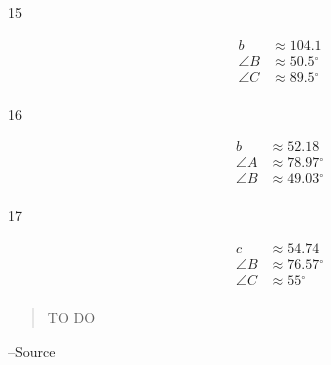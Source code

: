 \documentclass{exam}
\newcommand{\dg}{\ensuremath{^\circ}}
\begin{document}
\begin{description}
      \item[15]
        \begin{align*}
          b        & \approx 104.1 \\
          \angle B & \approx 50.5 \dg \\
          \angle C & \approx 89.5 \dg \\
        \end{align*}

      \item[16]
        \begin{align*}
          b        & \approx 52.18 \\
          \angle A & \approx 78.97 \dg \\
          \angle B & \approx 49.03 \dg \\
        \end{align*}

      \item[17]
        \begin{align*}
          c        & \approx 54.74 \\
          \angle B & \approx 76.57 \dg \\
          \angle C & \approx 55 \dg \\
        \end{align*}

    \end{description}

  \else
    \vspace{1 cm}
    \begin{quote}
      \begin{em}
        TO DO
      \end{em}
    \end{quote}
    \hspace{1 cm} --Source
  \fi
\end{document}
